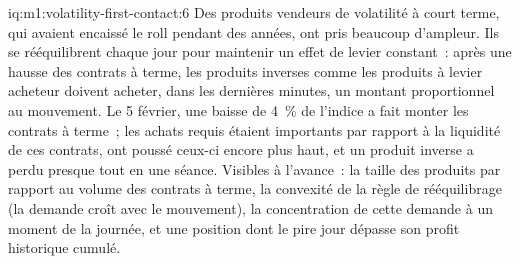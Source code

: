 \begin{solution}{iq:m1:volatility-first-contact:6}
Des produits vendeurs de volatilité à court terme, qui avaient encaissé le roll pendant
des années, ont pris beaucoup d'ampleur. Ils se rééquilibrent chaque jour pour maintenir
un effet de levier constant~: après une hausse des contrats à terme, les produits inverses
comme les produits à levier acheteur doivent acheter, dans les dernières minutes,
un montant proportionnel au mouvement. Le 5 février, une baisse de 4~\% de l'indice
a fait monter les contrats à terme~; les achats requis étaient importants par rapport
à la liquidité de ces contrats, ont poussé ceux-ci encore plus haut, et un produit inverse
a perdu presque tout en une séance. Visibles à l'avance~: la taille des produits par rapport
au volume des contrats à terme, la convexité de la règle de rééquilibrage (la demande
croît avec le mouvement), la concentration de cette demande à un moment de la journée, et une position dont le pire jour dépasse son profit historique cumulé.
\end{solution}

